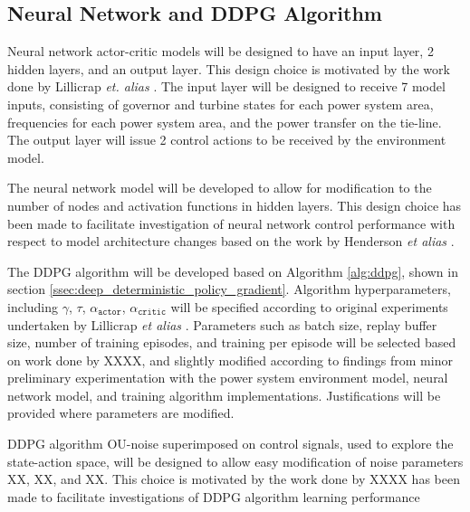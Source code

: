\subsection{Neural Network and DDPG Algorithm}
Neural network actor-critic models will be designed to have an input layer, 2 hidden layers, and an output layer. This design choice is motivated by the work done by Lillicrap \textit{et. alias} \cite{Lillicrap2015}. The input layer will be designed to receive 7 model inputs, consisting of governor and turbine states for each power system area, frequencies for each power system area, and the power transfer on the tie-line. The output layer will issue 2 control actions to be received by the environment model.

The neural network model will be developed to allow for modification to the number of nodes and activation functions in hidden layers. This design choice has been made to facilitate investigation of neural network control performance with respect to model architecture changes based on the work by Henderson \textit{et alias} \cite{Henderson2017}.

The DDPG algorithm will be developed based on Algorithm \ref{alg:ddpg}, shown in section \ref{ssec:deep_deterministic_policy_gradient}. Algorithm hyperparameters, including $\gamma$, $\tau$, $\alpha_{\texttt{actor}}$, $\alpha_{\texttt{critic}}$ will be specified according to original experiments undertaken by Lillicrap \textit{et alias} \cite{Lillicrap2015}. Parameters such as batch size, replay buffer size, number of training episodes, and training per episode will be selected based on work done by XXXX, and slightly modified according to findings from minor preliminary experimentation with the power system environment model, neural network model, and training algorithm implementations. Justifications will be provided where parameters are modified.

DDPG algorithm OU-noise superimposed on control signals, used to explore the state-action space, will be designed to allow easy modification of noise parameters XX, XX, and XX. This choice is motivated by the work done by XXXX has been made to facilitate investigations of DDPG algorithm learning performance 


